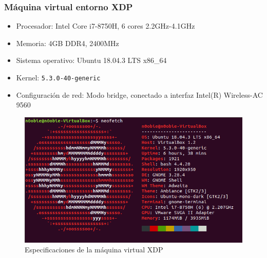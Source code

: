 \subsubsection{Máquina virtual entorno XDP}
\label{maquina_xdp}
\vspace{0.5cm}
    \begin{itemize}
        \item Procesador: Intel Core i7-8750H, 6 cores 2.2GHz-4.1GHz
        \item Memoria: 4GB DDR4, 2400MHz
        \item Sistema operativo: Ubuntu 18.04.3 LTS x86\_64
        \item Kernel: \texttt{5.3.0-40-generic}
        \item Configuración de red: Modo bridge, conectado a interfaz Intel(R) Wireless-AC 9560
    \end{itemize}
    \vspace{1cm}
        \begin{figure}[ht]
        \centering
        \includegraphics[width=12cm]{archivos/img/anexos/VM_xdp_edited.png}
        \caption{Especificaciones de la máquina virtual XDP}
        \label{fig:VM_xdp}
    \end{figure}



